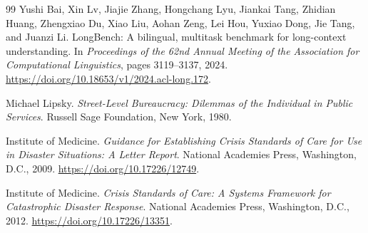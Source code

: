 \documentclass[11pt]{report}
\begin{document}
\begin{thebibliography}{99}
Yushi Bai, Xin Lv, Jiajie Zhang, Hongchang Lyu, Jiankai Tang,
Zhidian Huang, Zhengxiao Du, Xiao Liu, Aohan Zeng, Lei Hou,
Yuxiao Dong, Jie Tang, and Juanzi Li.
\newblock LongBench: A bilingual, multitask benchmark for long-context
understanding.
\newblock In \emph{Proceedings of the 62nd Annual Meeting of the
Association for Computational Linguistics}, pages 3119--3137, 2024.
\newblock \url{https://doi.org/10.18653/v1/2024.acl-long.172}.


Michael Lipsky.
\newblock \emph{Street-Level Bureaucracy: Dilemmas of the Individual in
Public Services}.
\newblock Russell Sage Foundation, New York, 1980.

Institute of Medicine.
\newblock \emph{Guidance for Establishing Crisis Standards of Care for Use
in Disaster Situations: A Letter Report}.
\newblock National Academies Press, Washington, D.C., 2009.
\newblock \url{https://doi.org/10.17226/12749}.

Institute of Medicine.
\newblock \emph{Crisis Standards of Care: A Systems Framework for
Catastrophic Disaster Response}.
\newblock National Academies Press, Washington, D.C., 2012.
\newblock \url{https://doi.org/10.17226/13351}.

\end{thebibliography}
\end{document}

